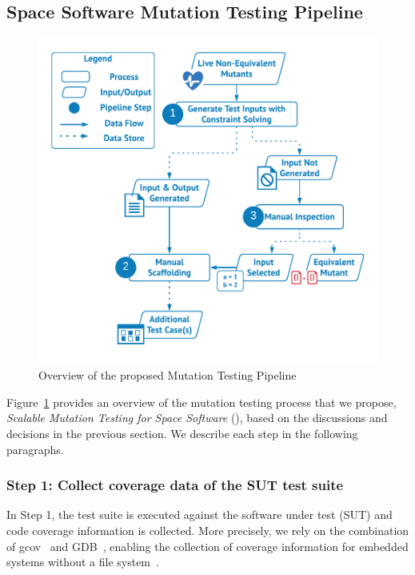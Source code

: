 \subsection{Space Software Mutation Testing Pipeline}
\label{sec:approach}

\begin{figure}[tb]
\begin{center}
\includegraphics[width=13cm]{images/MT2}
\caption{Overview of the proposed Mutation Testing Pipeline}
\label{fig:approach}
\end{center}
\end{figure}

Figure~\ref{fig:approach} provides an overview of the mutation testing process that we propose, 
\emph{Scalable Mutation Testing for Space Software} (\APPR), based on the discussions and decisions in the previous section. We describe each step in the following paragraphs. 

\subsubsection{Step 1: Collect coverage data of the SUT test suite}

In Step 1, the test suite is executed against the software under test (SUT) and code coverage information is collected. 
More precisely, we rely on the combination of gcov~\cite{GCOV}
and GDB~\cite{GDB}, enabling the collection of coverage information for embedded systems without a file system~\cite{THANASSIS}.

